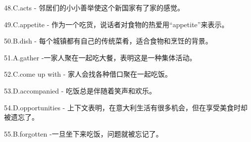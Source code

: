\documentclass[a4paper]{ctexart}
\begin{document}
48.C.acts - 邻居们的小小善举使这个新国家有了家的感觉。

49.C.appetite - 作为一个吃货，说话者对食物的热爱用“appetite”来表示。

50.B.dish - 每个城镇都有自己的传统菜肴，适合食物和烹饪的背景。

51.A.gather -一家人聚在一起吃大餐，表明这是一种集体活动。

52.C.come up with - 家人会找各种借口聚在一起吃饭。

53.D.accompanied - 吃饭总是伴随着笑声和欢乐。

54.D.opportunities - 上下文表明，在意大利生活有很多机会，但在享受美食时却被遗忘了。

55.B.forgotten -一旦坐下来吃饭，问题就被忘记了。
	
\end{document}
